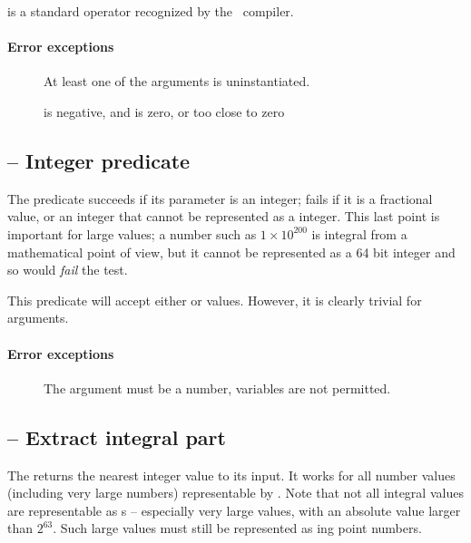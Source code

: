 \function{**} is a standard operator recognized by the \go\ compiler.
    
\paragraph{Error exceptions}
\begin{description}
\item[]
At least one of the arguments is uninstantiated.
\item[]
 is negative, and  is zero, or too close to zero
\end{description}

\subsection{ -- Integer predicate}
The  predicate succeeds if its parameter is an integer; fails if it is a fractional value, or an integer that cannot be represented as a integer. This last point is important for large values; a number such as $1\times10^{200}$ is integral from a mathematical point of view, but it cannot be represented as a 64 bit integer and so would \emph{fail} the  test.

This predicate will accept either  or  values. However, it is clearly trivial for  arguments.
    
\paragraph{Error exceptions}
\begin{description}
\item[]
The argument must be a number, variables are not permitted.
\end{description}

\subsection{ -- Extract integral part}
The  returns the nearest integer value to its input. It works for all number values (including very large numbers) representable by \go. Note that not all integral values are representable as s -- especially very large values, with an absolute value larger than $2^{63}$. Such large values must still be represented as ing point numbers.

